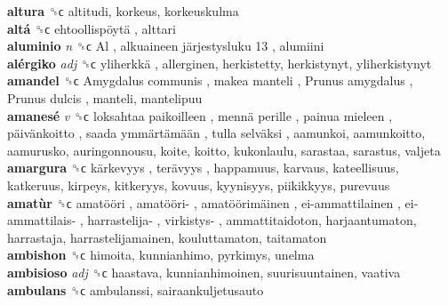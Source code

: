 \textbf{altura} ␝ϲ  altitudi, korkeus, korkeuskulma  \\
\textbf{altá} ␝ϲ   ehtoollispöytä , alttari  \\
\textbf{aluminio} \emph{n}  ␝ϲ   Al ,  alkuaineen järjestysluku 13 , alumiini  \\
\textbf{alérgiko} \emph{adj}  ␝ϲ   yliherkkä , allerginen, herkistetty, herkistynyt, yliherkistynyt  \\
\textbf{amandel} ␝ϲ   Amygdalus communis ,  makea manteli ,  Prunus amygdalus ,  Prunus dulcis , manteli, mantelipuu  \\
\textbf{amanesé} \emph{v}  ␝ϲ   loksahtaa paikoilleen ,  mennä perille ,  painua mieleen ,  päivänkoitto ,  saada ymmärtämään ,  tulla selväksi , aamunkoi, aamunkoitto, aamurusko, auringonnousu, koite, koitto, kukonlaulu, sarastaa, sarastus, valjeta  \\
\textbf{amargura} ␝ϲ   kärkevyys ,  terävyys , happamuus, karvaus, kateellisuus, katkeruus, kirpeys, kitkeryys, kovuus, kyynisyys, piikikkyys, purevuus  \\
\textbf{amatùr} ␝ϲ   amatööri ,  amatööri- ,  amatöörimäinen ,  ei-ammattilainen ,  ei-ammattilais- ,  harrastelija- ,  virkistys- , ammattitaidoton, harjaantumaton, harrastaja, harrastelijamainen, kouluttamaton, taitamaton  \\
\textbf{ambishon} ␝ϲ  himoita, kunnianhimo, pyrkimys, unelma  \\
\textbf{ambisioso} \emph{adj}  ␝ϲ  haastava, kunnianhimoinen, suurisuuntainen, vaativa  \\
\textbf{ambulans} ␝ϲ  ambulanssi, sairaankuljetusauto  \\
